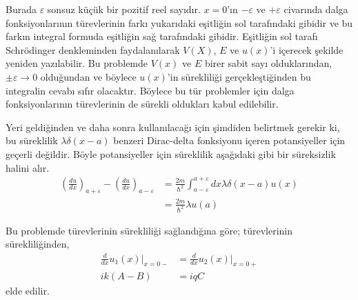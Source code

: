 \documentclass[a4paper,12pt, twoside]{article}
\begin{document}
Burada $\varepsilon$ sonsuz küçük bir pozitif reel sayıdır. $x=0$'ın $-\varepsilon$ ve $+\varepsilon$ civarında dalga fonksiyonlarının türevlerinin farkı yukarıdaki eşitliğin sol tarafındaki gibidir ve bu farkın integral formuda eşitliğin sağ tarafındaki gibidir. Eşitliğin sol tarafı Schrödinger denkleminden faydalanılarak $V(X)$, $E$ ve $u(x)$'i içerecek şekilde yeniden yazılabilir. Bu problemde $V(x)$ ve $E$ birer sabit sayı olduklarından, $\pm \varepsilon \rightarrow 0$ olduğundan ve böylece $u(x)$'in sürekliliği gerçekleştiğinden bu integralin cevabı sıfır olacaktır. Böylece bu tür problemler için dalga fonksiyonlarının türevlerinin de  sürekli oldukları kabul edilebilir. 

\begin{tcolorbox}
Yeri geldiğinden ve daha sonra kullanılacağı için şimdiden belirtmek gerekir ki, bu süreklilik $\lambda \delta(x-a)$ benzeri Dirac-delta fonksiyonu içeren potansiyeller için geçerli değildir. Böyle potansiyeller için süreklilik aşağıdaki gibi bir süreksizlik halini alır.
\begin{equation}
\begin{aligned} \left( \frac { d u } { d x } \right) _ { a + \varepsilon } - \left( \frac { d u } { d x } \right) _ { a - \varepsilon } & = \frac { 2 m } { \hbar ^ { 2 } } \int _ { a - \varepsilon } ^ { a + \varepsilon } d x \lambda \delta ( x - a ) u ( x ) \\ & = \frac { 2 m } { \hbar ^ { 2 } } \lambda u ( a ) \end{aligned}
\end{equation}
\end{tcolorbox}
	
Bu problemde türevlerinin sürekliliği sağlandığına göre; türevlerinin sürekliliğinden,
\begin{align}
\frac{d}{dx}u_1(x) \bigg|_{x=0-} &= \frac{d}{dx}u_2(x) \bigg|_{x=0+} \\
i k ( A - B ) &= i q C
\end{align}
elde edilir.
\end{document}
